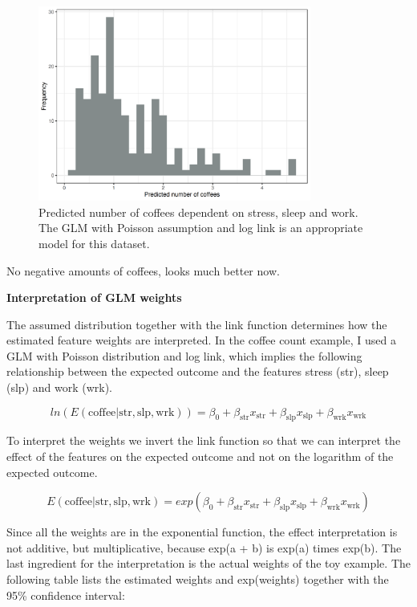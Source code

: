 \documentclass[
  11pt,
]{scrbook}
\begin{document}
\begin{figure}

{\centering \includegraphics[width=0.8\textwidth]{images/linear-model-positive-1} 

}

\caption{Predicted number of coffees dependent on stress, sleep and work. The GLM with Poisson assumption and log link is an appropriate model for this dataset.}\label{fig:linear-model-positive}
\end{figure}

No negative amounts of coffees, looks much better now.

\textbf{Interpretation of GLM weights}

The assumed distribution together with the link function determines how the estimated feature weights are interpreted.
In the coffee count example, I used a GLM with Poisson distribution and log link, which implies the following relationship between the expected outcome and the features stress (str), sleep (slp) and work (wrk).

\[ln(E(\text{coffee}|\text{str},\text{slp},\text{wrk}))=\beta_0+\beta_{\text{str}}x_{\text{str}}+\beta_{\text{slp}}x_{\text{slp}}+\beta_{\text{wrk}}x_{\text{wrk}}\]

To interpret the weights we invert the link function so that we can interpret the effect of the features on the expected outcome and not on the logarithm of the expected outcome.

\[E(\text{coffee}|\text{str},\text{slp},\text{wrk})=exp(\beta_0+\beta_{\text{str}}x_{\text{str}}+\beta_{\text{slp}}x_{\text{slp}}+\beta_{\text{wrk}}x_{\text{wrk}})\]

Since all the weights are in the exponential function, the effect interpretation is not additive, but multiplicative, because exp(a + b) is exp(a) times exp(b).
The last ingredient for the interpretation is the actual weights of the toy example.
The following table lists the estimated weights and exp(weights) together with the 95\% confidence interval:
\end{document}
